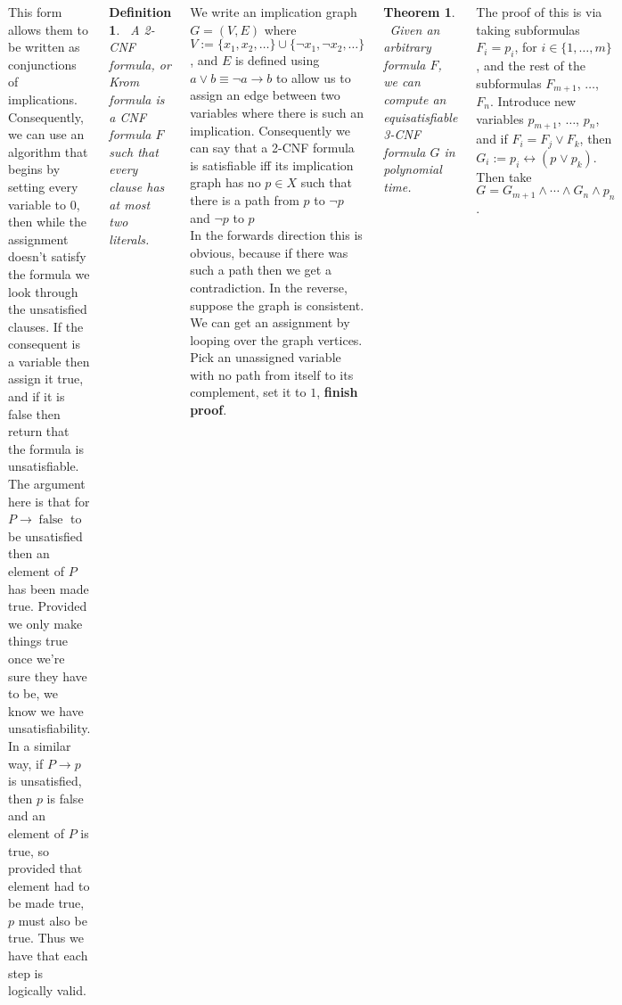 \documentclass{tikzposter} %
\DeclareMathOperator{\false}{false}
\newtheorem{theorem}{Theorem}
\newtheorem{definition}{Definition}
\begin{document}
\begin{columns}
{  This form allows them to be written as conjunctions of implications. Consequently, we can use an algorithm that begins by setting every variable to $0$, then while the assignment doesn't satisfy the formula we look through the unsatisfied clauses. If the consequent is a variable then assign it true, and if it is false then return that the formula is unsatisfiable. The argument here is that for $P \rightarrow \false$ to be unsatisfied then an element of $P$ has been made true. Provided we only make things true once we're sure they have to be, we know we have unsatisfiability. In a similar way, if $P \to p$ is unsatisfied, then $p$ is false and an element of $P$ is true, so provided that element had to be made true, $p$ must also be true. Thus we have that each step is logically valid. \\

  \begin{definition}
  \ A 2-CNF formula, or Krom formula is a CNF formula $F$ such that every clause has at most two literals.
  \end{definition}
  \hphantom{}

  We write an implication graph $G = (V,E)$ where $V := \{x_{1}, x_{2}, \dots\} \cup \{\neg x_{1}, \neg x_{2}, \dots\}$, and $E$ is defined using $a \lor b \equiv \neg a \rightarrow b$ to allow us to assign an edge between two variables where there is such an implication. Consequently we can say that a 2-CNF formula is satisfiable iff its implication graph has no $p \in X$ such that there is a path from $p$ to $\neg p$ and $\neg p$ to $p$ \\

  In the forwards direction this is obvious, because if there was such a path then we get a contradiction. In the reverse, suppose the graph is consistent. We can get an assignment by looping over the graph vertices. Pick an unassigned variable with no path from itself to its complement, set it to $1$, \textbf{finish proof}. \\

  \begin{theorem}
  \ Given an arbitrary formula $F$, we can compute an equisatisfiable 3-CNF formula $G$ in polynomial time.
  \end{theorem}
  \hphantom{}

  The proof of this is via taking subformulas $F_{i} = p_{i}$, for $i \in \{1,\dots,m\}$, and the rest of the subformulas $F_{m+1}$, $\dots$, $F_{n}$. Introduce new variables $p_{m+1}$, $\dots$, $p_{n}$, and if $F_{i} = F_{j} \lor F_{k}$, then $G_{i} := p_{i} \leftrightarrow (p_{} \lor p_{k})$. Then take $G = G_{m+1} \land \cdots \land G_{n} \land p_{n}$. \\

}
\end{columns}
\end{document}
